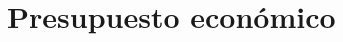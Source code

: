 \setlength{\parindent}{0em}

\chapter{Presupuesto económico}\label{cap7}\thispagestyle{fancy}

\vspace{-1.3cm}


